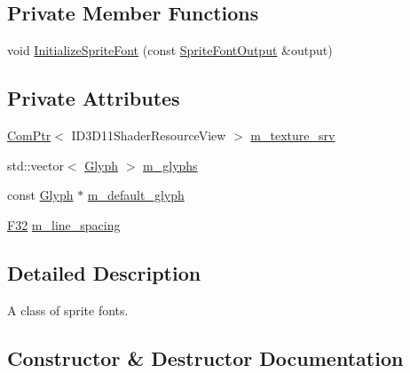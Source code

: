 \subsection*{Private Member Functions}
\begin{DoxyCompactItemize}
\item 
void \mbox{\hyperlink{classmage_1_1rendering_1_1_sprite_font_a832f140b987c30ef8f6a3b95afe52711}{Initialize\+Sprite\+Font}} (const \mbox{\hyperlink{structmage_1_1rendering_1_1_sprite_font_output}{Sprite\+Font\+Output}} \&output)
\end{DoxyCompactItemize}
\subsection*{Private Attributes}
\begin{DoxyCompactItemize}
\item 
\mbox{\hyperlink{namespacemage_ae74f374780900893caa5555d1031fd79}{Com\+Ptr}}$<$ I\+D3\+D11\+Shader\+Resource\+View $>$ \mbox{\hyperlink{classmage_1_1rendering_1_1_sprite_font_acdd3ca40befd9508a20011769046256e}{m\+\_\+texture\+\_\+srv}}
\item 
std\+::vector$<$ \mbox{\hyperlink{structmage_1_1rendering_1_1_glyph}{Glyph}} $>$ \mbox{\hyperlink{classmage_1_1rendering_1_1_sprite_font_aba69731bf4701ab790b1575515de22b9}{m\+\_\+glyphs}}
\item 
const \mbox{\hyperlink{structmage_1_1rendering_1_1_glyph}{Glyph}} $\ast$ \mbox{\hyperlink{classmage_1_1rendering_1_1_sprite_font_a0d60c46888b2b2a2c1787dcf6f0e041b}{m\+\_\+default\+\_\+glyph}}
\item 
\mbox{\hyperlink{namespacemage_aa97e833b45f06d60a0a9c4fc22ae02c0}{F32}} \mbox{\hyperlink{classmage_1_1rendering_1_1_sprite_font_acc3c1cefce72befc5c16db5ec39dd61f}{m\+\_\+line\+\_\+spacing}}
\end{DoxyCompactItemize}


\subsection{Detailed Description}
A class of sprite fonts. 

\subsection{Constructor \& Destructor Documentation}
\mbox{\label{classmage_1_1rendering_1_1_sprite_font_ad89c07ac484130956705880fd294f200}} 
